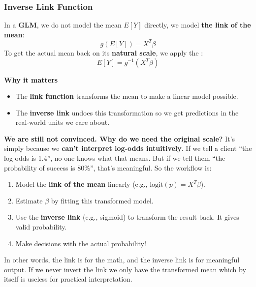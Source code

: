 \subsubsection{Inverse Link Function}

In a \textbf{GLM}, we do not model the mean $E[Y]$ directly, we model \textbf{the link of the mean}:
\begin{equation*}
    g(E[Y]) = X^T \beta
\end{equation*}
To get the actual mean back on its \textbf{natural scale}, we apply the :
\begin{equation}
    E[Y] = g^{-1}(X^T \beta)
\end{equation}

\highspace
\begin{flushleft}
    \textcolor{Green3}{ \textbf{Why it matters}}
\end{flushleft}
\begin{itemize}
    \item The \textbf{link function} transforms the mean to make a linear model possible.
    \item The \textbf{inverse link} undoes this transformation so we get predictions in the real-world units we care about.
\end{itemize}
\textcolor{Green3}{ \textbf{We are still not convinced. Why do we need the original scale?}} It's simply because we \textbf{can't interpret log-odds intuitively}. If we tell a client ``the log-odds is 1.4'', no one knows what that means. But if we tell them ``the probability of success is 80\%'', that's meaningful. So the workflow is:
\begin{enumerate}
    \item Model the \textbf{link of the mean} linearly (e.g., $\mathrm{logit}(p) = X^T \beta$).
    \item Estimate $\beta$ by fitting this transformed model.
    \item Use the \textbf{inverse link} (e.g., sigmoid) to transform the result back. It gives valid probability.
    \item Make decisions with the actual probability!
\end{enumerate}
In other words, the link is for the math, and the inverse link is for meaningful output. If we never invert the link we only have the transformed mean which by itself is useless for practical interpretation.

